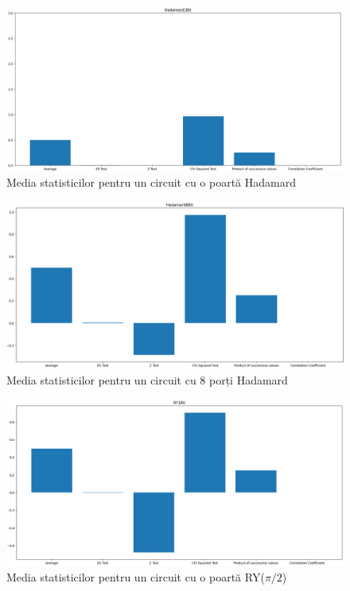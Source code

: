 \begin{figure}[H]
    \centering
    \includegraphics[width=1.0\textwidth]{continut/capitol4/figuri/StatsHadamard1Bit.png}
    \caption{Media statisticilor pentru un circuit cu o poartă Hadamard}
    \label{fig:StatsBarHadamard1Bit}
\end{figure}

\begin{figure}[H]
    \centering
    \includegraphics[width=1.0\textwidth]{continut/capitol4/figuri/StatsHadamard8Bit.png}
    \caption{Media statisticilor pentru un circuit cu 8 porți Hadamard}
    \label{fig:StatsBarHadamard8Bit}
\end{figure}

\begin{figure}[H]
    \centering
    \includegraphics[width=1.0\textwidth]{continut/capitol4/figuri/StatsRY1Bit.png}
    \caption{Media statisticilor pentru un circuit cu o poartă RY($\pi/2$)}
    \label{fig:StatsBarRY1Bit}
\end{figure}

